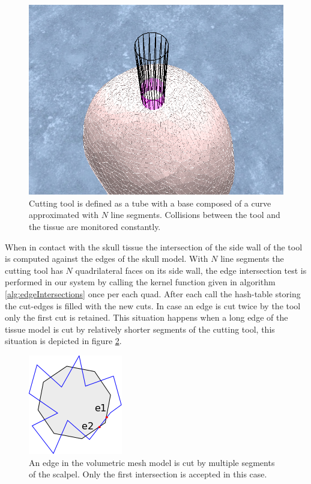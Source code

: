 \begin{figure}[H]
  \centering
  \includegraphics[width=0.6\linewidth]{figures/evaluation/craniotomytube.png}
  \caption{\label{fig:craniotomytube}
  {Cutting tool is defined as a tube with a base composed of a curve approximated with $N$ line segments. 
  Collisions between the tool and the tissue are monitored constantly.}
}
\end{figure}

When in contact with the skull tissue the intersection of the side wall of the tool is computed against the edges of the 
skull model. With $N$ line segments the cutting tool has $N$ quadrilateral faces on its side wall, the edge intersection 
test is performed in our system by calling the kernel function given in algorithm \ref{alg:edgeIntersections} once per each quad.
After each call the hash-table storing the cut-edges is filled with the new cuts. In case an edge is cut twice by the tool only 
the first cut is retained. This situation happens when a long edge of the tissue model is cut by relatively shorter segments of 
the cutting tool, this situation is depicted in figure \ref{fig:ringscalpalissue}.

\begin{figure}[H]
  \centering
  \includegraphics[width=0.2\linewidth]{figures/evaluation/ringscalpalissue.png}
  \caption{\label{fig:ringscalpalissue}
  {An edge in the volumetric mesh model is cut by multiple segments of the scalpel. 
    Only the first intersection is accepted in this case.}
}
\end{figure}

